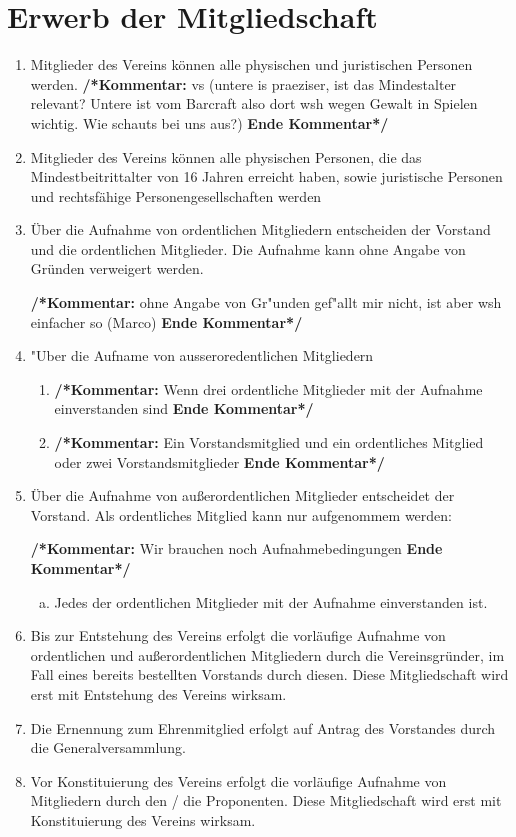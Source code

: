 \documentclass[a4paper,12pt]{article}
\newcommand{\comment}[1]{{\bf /*Kommentar:} #1 {\bf Ende Kommentar*/}}
\begin{document}
\section{Erwerb der Mitgliedschaft} %
\begin{enumerate}
\item Mitglieder des Vereins können alle physischen und juristischen Personen werden.
\comment{vs (untere is praeziser, ist das Mindestalter relevant? Untere ist vom Barcraft also dort wsh wegen Gewalt in Spielen wichtig. Wie schauts bei uns aus?)}
\item Mitglieder des Vereins können alle physischen Personen, die das Mindestbeitrittalter von 16 Jahren erreicht haben, sowie juristische Personen und rechtsfähige Personengesellschaften werden
\item Über die Aufnahme von ordentlichen Mitgliedern entscheiden der Vorstand und die ordentlichen Mitglieder. Die Aufnahme kann ohne Angabe von Gründen verweigert werden. 

\comment{ohne Angabe von Gr"unden gef"allt mir nicht, ist aber wsh einfacher so (Marco)}

\item "Uber die Aufname von ausseroredentlichen Mitgliedern
	\begin{enumerate}
	\item \comment{Wenn drei ordentliche Mitglieder mit der Aufnahme einverstanden sind}
	\item \comment{Ein Vorstandsmitglied und ein ordentliches Mitglied oder zwei Vorstandsmitglieder}
	\end{enumerate}
\item Über die Aufnahme von außerordentlichen Mitglieder entscheidet der Vorstand. Als ordentliches Mitglied kann nur aufgenommem werden:


\comment{Wir brauchen noch Aufnahmebedingungen}
	\begin{enumerate}[(a)]
	\item Jedes der ordentlichen Mitglieder mit der Aufnahme einverstanden ist.
	\end{enumerate}
\item Bis zur Entstehung des Vereins erfolgt die vorläufige Aufnahme von ordentlichen und außerordentlichen Mitgliedern durch die Vereinsgründer, im Fall eines bereits bestellten Vorstands durch diesen. Diese Mitgliedschaft wird erst mit Entstehung des Vereins wirksam.
\item Die Ernennung zum Ehrenmitglied erfolgt auf Antrag des Vorstandes durch die Generalversammlung.
\item Vor Konstituierung des Vereins erfolgt die vorläufige Aufnahme von Mitgliedern durch den / die Proponenten. Diese Mitgliedschaft wird erst mit Konstituierung des Vereins wirksam.
\end{enumerate}
\end{document}
